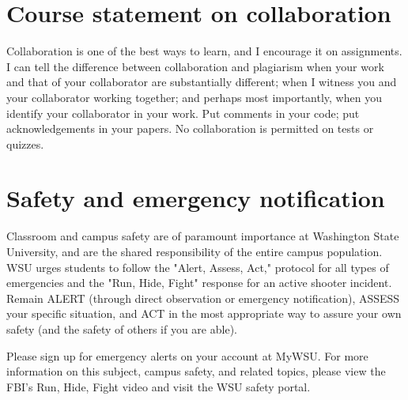\documentclass[12pt]{article}
\begin{document}
\section*{Course statement on collaboration}

Collaboration is one of the best ways to learn, and I encourage it on
assignments. I can tell the difference between collaboration and
plagiarism when your work and that of your collaborator are
substantially different; when I witness you and your collaborator
working together; and perhaps most importantly, when you identify your
collaborator in your work. Put comments in your code; put
acknowledgements in your papers. No collaboration is permitted on
tests or quizzes.

\section*{Safety and emergency notification}

Classroom and campus safety are of paramount importance at Washington
State University, and are the shared responsibility of the entire
campus population. WSU urges students to follow the "Alert, Assess,
Act," protocol for all types of emergencies and the "Run, Hide, Fight"
response for an active shooter incident. Remain ALERT (through direct
observation or emergency notification), ASSESS your specific
situation, and ACT in the most appropriate way to assure your own
safety (and the safety of others if you are able).

Please sign up for emergency alerts on your account at MyWSU. For more
information on this subject, campus safety, and related topics, please
view the FBI's Run, Hide, Fight video and visit the WSU safety portal.
\end{document}
